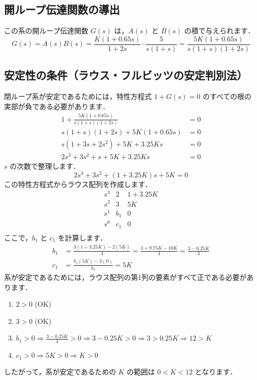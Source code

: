 \documentclass[11pt,a4paper]{ltjsarticle}
\begin{document}
\subsection{開ループ伝達関数の導出}
この系の開ループ伝達関数 $G(s)$ は，$A(s)$ と $B(s)$ の積で与えられます．
\begin{equation*}
    G(s) = A(s)B(s) = \frac{K(1+0.65s)}{1+2s} \cdot \frac{5}{s(1+s)} = \frac{5K(1+0.65s)}{s(1+s)(1+2s)}
\end{equation*}

\subsection{安定性の条件（ラウス・フルビッツの安定判別法）}
閉ループ系が安定であるためには，特性方程式 $1+G(s)=0$ のすべての根の実部が負である必要があります．
\begin{align*}
    1 + \frac{5K(1+0.65s)}{s(1+s)(1+2s)} &= 0 \\
    s(1+s)(1+2s) + 5K(1+0.65s) &= 0 \\
    s(1+3s+2s^2) + 5K+3.25Ks &= 0 \\
    2s^3+3s^2+s+5K+3.25Ks &= 0
\end{align*}
$s$ の次数で整理します．
\begin{equation*}
    2s^3+3s^2+(1+3.25K)s+5K=0
\end{equation*}
この特性方程式からラウス配列を作成します．
\[
\begin{array}{c|cc}
s^3 & 2 & 1+3.25K \\
s^2 & 3 & 5K \\
s^1 & b_1 & 0 \\
s^0 & c_1 & 0 \\
\end{array}
\]
ここで，$b_1$ と $c_1$ を計算します．
\begin{align*}
    b_1 &= \frac{3(1+3.25K) - 2(5K)}{3} = \frac{3+9.75K-10K}{3} = \frac{3-0.25K}{3} \\
    c_1 &= \frac{b_1(5K) - 3(0)}{b_1} = 5K
\end{align*}
系が安定であるためには，ラウス配列の第1列の要素がすべて正である必要があります．
\begin{enumerate}
    \item $2 > 0$ (OK)
    \item $3 > 0$ (OK)
    \item $b_1 > 0 \Rightarrow \frac{3-0.25K}{3} > 0 \Rightarrow 3-0.25K > 0 \Rightarrow 3 > 0.25K \Rightarrow 12 > K$
    \item $c_1 > 0 \Rightarrow 5K > 0 \Rightarrow K > 0$
\end{enumerate}
したがって，系が安定であるための $K$ の範囲は $0 < K < 12$ となります．
\end{document}
